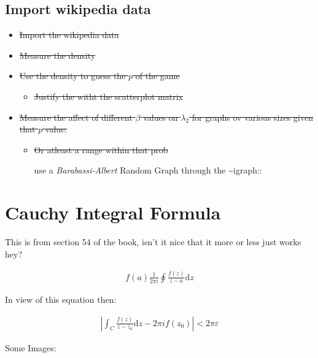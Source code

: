\documentclass[11pt]{article}
\begin{document}
\subsection{Import wikipedia data}
\label{sec:org6df90c9}
\begin{itemize}
\item \sout{Import the wikipedia data}
\item \sout{Measure the density}
\item \sout{Use the density to guess the \(p\) of the game}
\begin{itemize}
\item \sout{Justify the witht the scatterplot matrix}
\end{itemize}
\item \sout{Measure the affect of different \(\beta\) values on \(\lambda_2\) for graphs ov various sizes given that \(p\) value.}
\begin{itemize}
\item \sout{Or atleast a range within that prob}

use a \emph{Barabassi-Albert} Random Graph through the \textasciitilde{}igraph::
\end{itemize}
\end{itemize}

\section{Cauchy Integral Formula}
\label{cauchy-integral-formula}
This is from section 54 of the book, isn't it nice that it more or less
just works hey? \cite{zhangMakingEigenvectorBasedReputation2004}

\begin{align}
f\left( a \right) \frac{1}{2\pi i} \oint \frac{f\left( z \right)}{z- a}\mathrm{d}z
\end{align}

In view of this equation then: \cite{zhangMakingEigenvectorBasedReputation2004}

$$\begin{aligned}
\left| \int_C \frac{f\left( z \right)}{z- z_0} \mathrm{d}z - 2 \pi i f\left( z_0 \right) \right|<2 \pi \varepsilon
\end{aligned}$$

Some Images: \cite{ngStableAlgorithmsLink2001}
\end{document}

